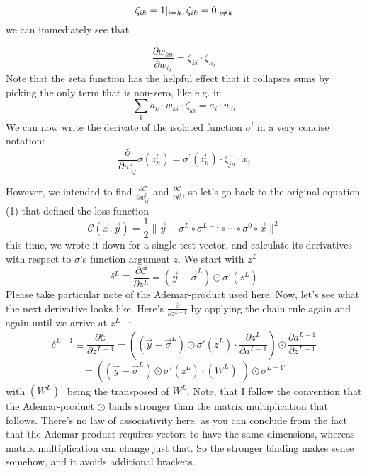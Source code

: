 \documentclass[]{scrartcl}
\begin{document}
\begin{equation}
\zeta_{ik} = 1 \arrowvert_{i = k} , \zeta_{ik} = 0 \arrowvert_{i \neq k}
\end{equation}
we can immediately see that

\begin{equation}
\frac{\partial w_{kn}}{\partial w_{ij}} = \zeta_{ki} \cdot \zeta_{nj}
\end{equation}
Note that the zeta function has the helpful effect that it collapses sums by picking the only term that is non-zero, like e.g. in
\begin{equation}
\sum_k a_k \cdot w_{ki} \cdot \zeta_{ki} = a_i \cdot w_{ii} 
\end{equation}
We can now write the derivate of the isolated function \(\sigma^l\) 
in a very concise notation:
\begin{equation}
\frac{\partial}{\partial w^l_{ij}}\sigma(z^l_n) = \sigma^\prime(z^l_n) \cdot \zeta_{jn} \cdot x_i
\end{equation}

However, we intended to find \( \frac{\partial\mathcal{C}}{\partial w^l_{ij}} \) and \( \frac{\partial\mathcal{C}}{\partial b^l} \), so let's go back to the original equation (1) that defined the loss function
\begin{equation}
\mathcal{C}(\vec{x},\vec{y}) = \frac{1}{2}\| \vec{y} - \sigma^L \circ \sigma^{L-1} \circ \cdots \circ \sigma^0 \circ \vec{x}\|^2
\end{equation}
this time, we wrote it down for a single test vector, and calculate its derivatives with respect to \( \sigma \)'s function argument \( z \). We start with \(z^L\)
\begin{equation}
\delta^L \equiv \frac{\partial\mathcal{C}}{\partial z^L } = ( \vec{y}-\vec{\sigma}^L) \odot \sigma'(z^L)
\end{equation}
Please take particular note of the Ademar-product used here. Now, let's see what the next derivative looks like. Here's  \( \frac{\partial}{\partial z^{L-1}} \) by applying the chain rule again and again until we arrive at \( z^{L-1} \)
\begin{equation}
\delta^{L-1} \equiv \frac{\partial\mathcal{C}}{\partial z^{L-1} } =
\left( ( \vec{y}-\vec{\sigma}^L) \odot \sigma'(z^L) 
\cdot    \frac{\partial z^L} {\partial a^{L-1}}\right)
\odot \frac{\partial a^{L-1}}{\partial z^{L-1}}
\end{equation}
\begin{equation}
= \left( ( \vec{y}-\vec{\sigma}^L) \odot \sigma'(z^L) 
\cdot   (W^{L})^\dagger \right) \odot \sigma^{L-1'}
\end{equation}
with \(   (W^{L})^\dagger  \) being the transposed of \(W^L\). Note, that I follow the convention that the Ademar-product \( \odot \) binds stronger than the matrix multiplication that follows. There's no law of associativity here, as you can conclude from the fact that the Ademar product requires vectors to have the same dimensions, whereas matrix multiplication can change just that. So the stronger binding makes sense somehow, and it avoids additional brackets.
\end{document}
